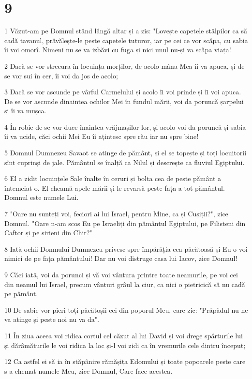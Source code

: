 \chapter{9}

\par 1 Văzut-am pe Domnul stând lângă altar și a zis: "Lovește capetele stâlpilor ca să cadă tavanul, prăvălește-le peste capetele tuturor, iar pe cei ce vor scăpa, cu sabia îi voi omorî. Nimeni nu se va izbăvi cu fuga și nici unul nu-și va scăpa viața!
\par 2 Dacă se vor strecura în locuința morților, de acolo mâna Mea îi va apuca, și de se vor sui în cer, îi voi da jos de acolo;
\par 3 Dacă se vor ascunde pe vârful Carmelului și acolo îi voi prinde și îi voi apuca. De se vor ascunde dinaintea ochilor Mei în fundul mării, voi da poruncă șarpelui și îi va mușca.
\par 4 În robie de se vor duce înaintea vrăjmașilor lor, și acolo voi da poruncă și sabia îi va ucide, căci ochii Mei Eu îi ațintesc spre rău iar nu spre bine!
\par 5 Domnul Dumnezeu Savaot se atinge de pământ, și el se topește și toți locuitorii sînt cuprinși de jale. Pământul se înalță ca Nilul și descrește ca fluviul Egiptului.
\par 6 El a zidit locuințele Sale înalte în ceruri și bolta cea de peste pământ a întemeiat-o. El cheamă apele mării și le revarsă peste fața a tot pământul. Domnul este numele Lui.
\par 7 "Oare nu sunteți voi, feciori ai lui Israel, pentru Mine, ca și Cușiții?", zice Domnul. "Oare n-am scos Eu pe Israeliți din pământul Egiptului, pe Filisteni din Caftor și pe sirieni din Chir?"
\par 8 Iată ochii Domnului Dumnezeu privesc spre împărăția cea păcătoasă și Eu o voi nimici de pe fața pământului! Dar nu voi distruge casa lui Iacov, zice Domnul!
\par 9 Căci iată, voi da porunci și vă voi vântura printre toate neamurile, pe voi cei din neamul lui Israel, precum vânturi grâul la ciur, ca nici o pietricică să nu cadă pe pământ.
\par 10 De sabie vor pieri toți păcătoșii cei din poporul Meu, care zic: "Prăpădul nu ne va atinge și peste noi nu va da".
\par 11 În ziua aceea voi ridica cortul cel căzut al lui David și voi drege spărturile lui și dărâmăturile le voi ridica la loc și-l voi zidi ca în vremurile cele dintru început;
\par 12 Ca astfel ei să ia în stăpânire rămășița Edomului și toate popoarele peste care s-a chemat numele Meu, zice Domnul, Care face acestea.

